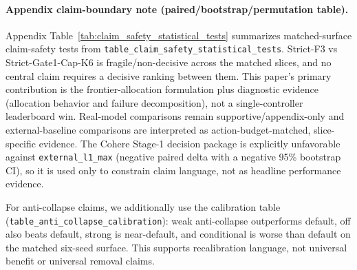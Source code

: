 \paragraph{Appendix claim-boundary note (paired/bootstrap/permutation table).}
Appendix Table~\ref{tab:claim_safety_statistical_tests} summarizes matched-surface claim-safety tests from \texttt{table\_claim\_safety\_statistical\_tests}. Strict-F3 vs Strict-Gate1-Cap-K6 is fragile/non-decisive across the matched slices, and no central claim requires a decisive ranking between them. This paper's primary contribution is the frontier-allocation formulation plus diagnostic evidence (allocation behavior and failure decomposition), not a single-controller leaderboard win. Real-model comparisons remain supportive/appendix-only and external-baseline comparisons are interpreted as action-budget-matched, slice-specific evidence. The Cohere Stage-1 decision package is explicitly unfavorable against \texttt{external\_l1\_max} (negative paired delta with a negative 95\% bootstrap CI), so it is used only to constrain claim language, not as headline performance evidence.

For anti-collapse claims, we additionally use the calibration table (\texttt{table\_anti\_collapse\_calibration}): weak anti-collapse outperforms default, off also beats default, strong is near-default, and conditional is worse than default on the matched six-seed surface. This supports recalibration language, not universal benefit or universal removal claims.
